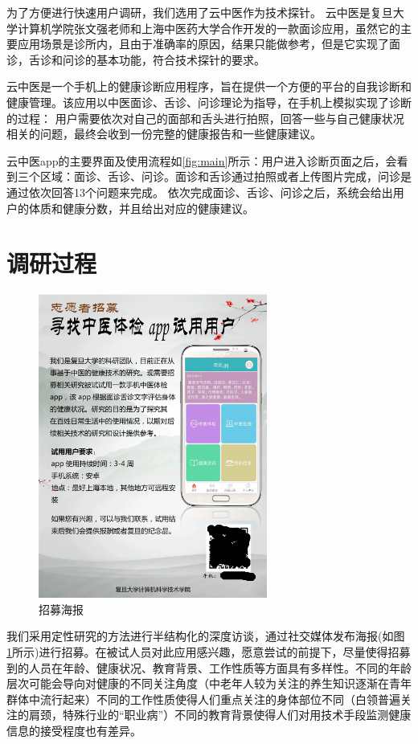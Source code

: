 为了方便进行快速用户调研，我们选用了云中医\cite{Zhang2018Study}作为技术探针。
云中医是复旦大学计算机学院张文强老师和上海中医药大学合作开发的一款面诊应用，虽然它的主要应用场景是诊所内，且由于准确率的原因，结果只能做参考，但是它实现了面诊，舌诊和问诊的基本功能，符合技术探针的要求。

云中医是一个手机上的健康诊断应用程序，旨在提供一个方便的平台的自我诊断和健康管理。该应用以中医面诊、舌诊、问诊理论为指导，在手机上模拟实现了诊断的过程：
用户需要依次对自己的面部和舌头进行拍照，回答一些与自己健康状况相关的问题，最终会收到一份完整的健康报告和一些健康建议。

云中医app的主要界面及使用流程如\ref{fig:main}所示：用户进入诊断页面之后，会看到三个区域：面诊、舌诊、问诊。面诊和舌诊通过拍照或者上传图片完成，问诊是通过依次回答13个问题来完成。
依次完成面诊、舌诊、问诊之后，系统会给出用户的体质和健康分数，并且给出对应的健康建议。



\section{调研过程}
 
\begin{figure}[h]
    \centering
    \includegraphics[height=10cm]{images/poster.png}
    \caption{招募海报}
    \label{fig:poster}
\end{figure}


我们采用定性研究的方法进行半结构化的深度访谈，通过社交媒体发布海报(如图 \ref{fig:poster}所示)进行招募。在被试人员对此应用感兴趣，愿意尝试的前提下，尽量使得招募到的人员在年龄、健康状况、教育背景、工作性质等方面具有多样性。不同的年龄层次可能会导向对健康的不同关注角度（中老年人较为关注的养生知识逐渐在青年群体中流行起来）不同的工作性质使得人们重点关注的身体部位不同（白领普遍关注的肩颈，特殊行业的“职业病”）不同的教育背景使得人们对用技术手段监测健康信息的接受程度也有差异。


